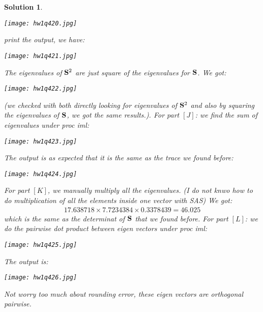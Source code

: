 \documentclass[11pt]{article}\usepackage[]{graphicx}\usepackage[]{color}
\newtheorem{sol}{Solution}
\begin{document}
\begin{sol}
\begin{center}
		\texttt{[image: hw1q420.jpg]}
	\end{center}
	print the output, we have:
	\begin{center}
		\texttt{[image: hw1q421.jpg]}
	\end{center}
	The eigenvalues of ${\bf S}^2$ are just square of the eigenvalues for ${\bf S}$. We got:
	\begin{center}
		\texttt{[image: hw1q422.jpg]}
	\end{center}
	(we checked with both directly looking for eigenvalues of ${\bf S}^2$ and also by squaring the eigenvalues of ${\bf S}$, we got the same results.).
	For part $[J]$:\vskip 2mm
	we find the sum of eigenvalues under proc iml:
	\begin{center}
		\texttt{[image: hw1q423.jpg]}
	\end{center}
	The output is as expected that it is the same as the trace we found before:
	\begin{center}
		\texttt{[image: hw1q424.jpg]}
	\end{center}
	For part $[K]$, we manually multiply all the eigenvalues. (I do not knwo how to do multiplication of all the elements inside one vector with SAS)
	We got:
	\begin{align*}
		17.638718\times 7.7234384 \times 0.3378439 = 46.025
	\end{align*}
	which is the same as the determinat of ${\bf S}$ that we found before.
	\vskip 2mm
	For part $[L]$:\vskip 2mm
	we do the pairwise dot product between eigen vectors under proc iml:
	\begin{center}
		\texttt{[image: hw1q425.jpg]}
	\end{center}
	The output is:
	\begin{center}
		\texttt{[image: hw1q426.jpg]}
	\end{center}
	Not worry too much about rounding error, these eigen vectors are orthogonal pairwise.
\end{sol}
\end{document}
